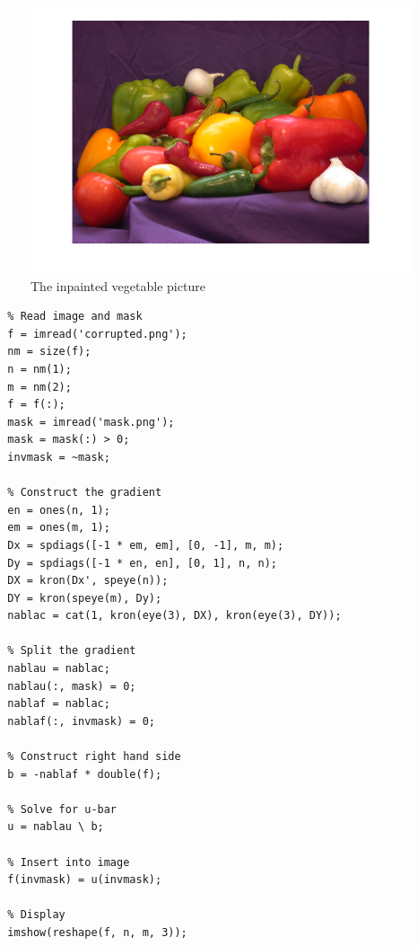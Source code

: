 \documentclass[10pt,a4paper]{article}
\begin{document}
\begin{figure}[h]
  \centering
  \includegraphics[width=\textwidth]{sheet-1/inpainted}
  \caption{The inpainted vegetable picture}
  \label{fig:inpainted}
\end{figure}

\begin{verbatim}
  % Read image and mask
  f = imread('corrupted.png');
  nm = size(f);
  n = nm(1);
  m = nm(2);
  f = f(:);
  mask = imread('mask.png');
  mask = mask(:) > 0;
  invmask = ~mask;

  % Construct the gradient
  en = ones(n, 1);
  em = ones(m, 1);
  Dx = spdiags([-1 * em, em], [0, -1], m, m);
  Dy = spdiags([-1 * en, en], [0, 1], n, n);
  DX = kron(Dx', speye(n));
  DY = kron(speye(m), Dy);
  nablac = cat(1, kron(eye(3), DX), kron(eye(3), DY));

  % Split the gradient
  nablau = nablac;
  nablau(:, mask) = 0;
  nablaf = nablac;
  nablaf(:, invmask) = 0;

  % Construct right hand side
  b = -nablaf * double(f);

  % Solve for u-bar
  u = nablau \ b;

  % Insert into image
  f(invmask) = u(invmask);

  % Display
  imshow(reshape(f, n, m, 3));
\end{verbatim}
\end{document}
